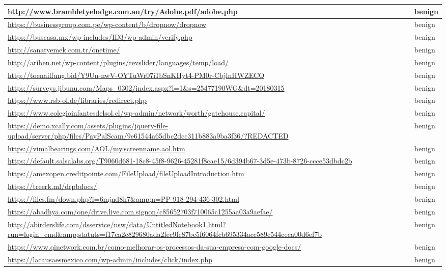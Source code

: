 \documentclass[12pt,twoside]{report}
\begin{document}
\begin{spacing}{1}
\begin{center}
\begin{longtable}{ |>{\raggedright\arraybackslash}p{}|>{\raggedright\arraybackslash}p{}| }
\\
\hline
\url{http://www.brambletyelodge.com.au/try/Adobe.pdf/adobe.php} & benign
\\
\hline
\url{https://businessgroup.com.pe/wp-content/b/dropnow/dropnow} & benign
\\
\hline
\url{https://buscasa.mx/wp-includes/ID3/wp-admin/verify.php} & benign
\\
\hline
\url{http://sanatyemek.com.tr/onetime/} & benign
\\
\hline
\url{http://ariben.net/wp-content/plugins/revslider/languages/temp/load/} & benign
\\
\hline
\url{http://toenailfung.bid/Y9Un-nwV-OYTuWr07i1bSnKHyt4-PM0r-CbjlnHWZECQ} & benign
\\
\hline
\url{https://surveys.jibunu.com/Maps_0302/index.aspx?l=1&s=25477190WG&dt=20180315} & benign
\\
\hline
\url{https://www.rsb-ol.de/libraries/redirect.php} & benign
\\
\hline
\url{https://www.colegioinfantesdelsol.cl/wp-admin/network/worth/gatehouse.capital/} & benign
\\
\hline
\url{https://demo.xcally.com/assets/plugins/jquery-file-upload/server/php/files/PayPalScam/9e61544a65dbc2dcc311b883a9ba3f36/?REDACTED} & benign
\\
\hline
\url{https://vimalbearings.com/AOL/my.screenname.aol.htm} & benign
\\
\hline
\url{https://default.salsalabs.org/T9060d681-18c8-45f8-9626-45281f8cae15/6d394b67-3d5e-473b-8726-ccce53dbdc2b} & benign
\\
\hline
\url{https://amexopen.creditpointe.com/FileUpload/fileUploadIntroduction.htm} & benign
\\
\hline
\url{https://treerk.ml/drpbdocs/} & benign
\\
\hline
\url{https://files.fm/down.php?i=6mjnd8h7&amp;n=PP-918-294-436-302.html} & benign
\\
\hline
\url{https://abadhya.com/one/drive.live.com.signon/c85652703f710065c1255aa03a9aefae/} & benign
\\
\hline
\url{http://abirderslife.com/dsservice/nsw/data/UntitledNotebook1.html?run=login_cmd&amp;statuts=f17ca2c829680ada2fec9fc87bc5f6064fcb695334acc589c544ceca00d6ef7b} & benign
\\
\hline
\url{https://www.qinetwork.com.br/como-melhorar-os-processos-da-sua-empresa-com-google-docs/} & benign
\\
\hline
\url{https://lacausaesmexico.com/wp-admin/includes/click/index.php} & benign

\end{longtable}
\end{center}
\end{spacing}
\end{document}
